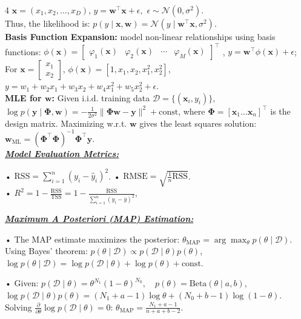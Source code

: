 \documentclass[10pt]{article}
\newcommand{\bulletPoint}[1]{\ul{\textit{\textbf{#1}}}}
\begin{document}
\begin{multicols*}{4}
$\mathbf{x} = (x_1, x_2, \dots, x_D)$, 
$y = \mathbf{w}^\top \mathbf{x} + \epsilon, $ $ \epsilon \sim \mathcal{N}(0, \sigma^2)$.\\
Thus, the likelihood is:
$p(y \mid \mathbf{x}, \mathbf{w}) = \mathcal{N}(y \mid \mathbf{w}^\top \mathbf{x}, \sigma^2)$. \\
\textbf{Basis Function Expansion:} model non-linear relationships using basis functions:
$
\phi(\mathbf{x}) =
\begin{bmatrix}
\varphi_1(\mathbf{x}) & \varphi_2(\mathbf{x}) & \cdots & \varphi_M(\mathbf{x})
\end{bmatrix}^{\top}
$
, \quad
$y = \mathbf{w}^\top \phi(\mathbf{x}) + \epsilon$; 
For $\mathbf{x} = \begin{bmatrix} x_1 \\ x_2 \end{bmatrix}$, $\phi(\mathbf{x}) = [1, x_1, x_2, x_1^2, x_2^2]$,
$y = w_1 + w_2 x_1 + w_3 x_2 + w_4 x_1^2 + w_5 x_2^2 + \epsilon$. \\
\textbf{MLE for $\mathbf{w}$:} Given i.i.d. training data $\mathcal{D} = \{(\mathbf{x}_i, y_i)\}$, 
$\log p(\mathbf{y} \mid \mathbf{\Phi}, \mathbf{w}) = -\frac{1}{2\sigma^2} \|\mathbf{\Phi} \mathbf{w} - \mathbf{y} \|^2 + \text{const}$,
where $\mathbf{\Phi} = [\mathbf{x}_1 \dots \mathbf{x}_n]^\top$ is the design matrix.
Maximizing w.r.t. $\mathbf{w}$ gives the least squares solution:
$\mathbf{w}_{\text{ML}} = (\mathbf{\Phi}^\top \mathbf{\Phi})^{-1} \mathbf{\Phi}^\top \mathbf{y}$. \\


\bulletPoint{Model Evaluation Metrics:}\quad

• $\text{RSS} = \sum_{i=1}^{n} (y_i - \hat{y}_i)^2$. \quad
• $\text{RMSE} = \sqrt{\frac{1}{n} \text{RSS}}$. \\
• $R^2 = 1 - \frac{\text{RSS}}{\text{TSS}} = 1 - \frac{\text{RSS}}{\sum_{i=1}^{n} (y_i - \bar{y})^2}$,

\bulletPoint{Maximum A Posteriori (MAP) Estimation:}\quad

• The MAP estimate maximizes the posterior:
$\theta_{\text{MAP}} = \arg\max_{\theta} p(\theta \mid \mathcal{D})$. Using Bayes' theorem: $p(\theta \mid \mathcal{D}) \propto p(\mathcal{D} \mid \theta) p(\theta)$,
$\log p(\theta \mid \mathcal{D}) = \log p(\mathcal{D} \mid \theta) + \log p(\theta) + \text{const}$. 

• Given:
$p(\mathcal{D} \mid \theta) = \theta^{N_1} (1 - \theta)^{N_0}, \quad p(\theta) = \text{Beta}(\theta \mid a, b)$,
$\log p(\mathcal{D} \mid \theta) p(\theta) = (N_1 + a - 1) \log \theta + (N_0 + b - 1) \log(1 - \theta)$.
Solving $\frac{\partial}{\partial \theta} \log p(\mathcal{D} \mid \theta) = 0$:
$\theta_{\text{MAP}} = \frac{N_1 + a - 1}{n + a + b - 2}$.


\end{multicols*}
\end{document}
